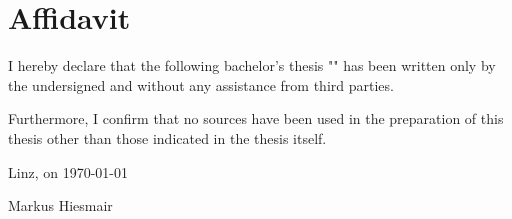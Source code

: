 \chapter*{Affidavit}

I hereby declare that the following bachelor's thesis "\thesistitle{}" has been written
only by the undersigned and without any assistance from third parties.

Furthermore, I confirm that no sources have been used in the preparation of this thesis other than those indicated in the thesis itself.

Linz, on \today

\hfill Markus Hiesmair

